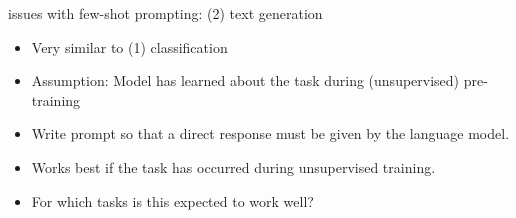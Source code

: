 \begin{frame}{issues with few-shot prompting: (2) text generation}

\vfill

\begin{itemize}
\item Very similar to (1) classification
    \item Assumption: Model has learned about the task during (unsupervised) pre-training 
    \item Write prompt so that  a direct response must be
    given by the language model.
\item Works best if the task has occurred during
unsupervised training.
    \item \ques For which tasks is this expected to work well?
\end{itemize}

\vfill

\end{frame}




%
%
%
%
%

%
%
%
%
%


